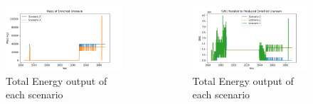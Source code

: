 \begin{frame}
\begin{columns}
        \column[t]{5cm}
    \begin{figure}[t]
        \includegraphics[scale=0.25,trim=0 5 0 10,clip]{figures/enrichedU_advancedrx.png}
        \caption{Total Energy output of each scenario}
        \label{fig:enrichedU}
    \end{figure}
    \begin{figure}[h]
        \includegraphics[scale=0.25,trim=0 5 0 10,clip]{figures/swu_all.png}
        \caption{Total Energy output of each scenario}
        \label{fig:swu}
    \end{figure}
    \end{columns}


\end{frame}

